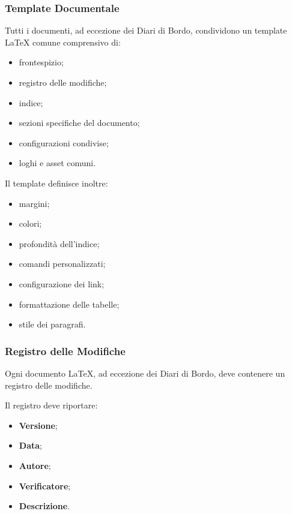 
\subsubsection{Template Documentale}

Tutti i documenti, ad eccezione dei Diari di Bordo, condividono un template
\LaTeX{} comune comprensivo di:

\begin{itemize}
    \item frontespizio;
    \item registro delle modifiche;
    \item indice;
    \item sezioni specifiche del documento;
    \item configurazioni condivise;
    \item loghi e asset comuni.
\end{itemize}

Il template definisce inoltre:
\begin{itemize}
    \item margini;
    \item colori;
    \item profondità dell'indice;
    \item comandi personalizzati;
    \item configurazione dei link;
    \item formattazione delle tabelle;
    \item stile dei paragrafi.
\end{itemize}


\subsubsection{Registro delle Modifiche}

Ogni documento \LaTeX{}, ad eccezione dei Diari di Bordo, deve contenere un registro
delle modifiche.

Il registro deve riportare:

\begin{itemize}
    \item \textbf{Versione};
    \item \textbf{Data};
    \item \textbf{Autore};
    \item \textbf{Verificatore};
    \item \textbf{Descrizione}.
\end{itemize}


